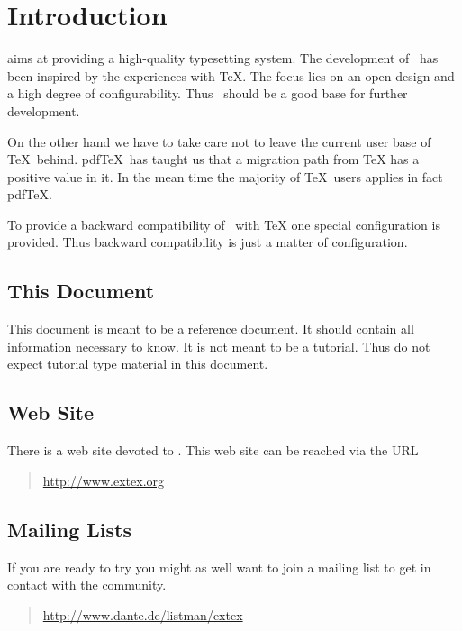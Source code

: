 \documentclass{extex-doc}
\begin{document}
\chapter{Introduction}

\ExTeX{} aims at providing a high-quality typesetting system. The
development of \ExTeX\ has been inspired by the experiences with \TeX.
The focus lies on an open design and a high degree of configurability.
Thus \ExTeX\ should be a good base for further development.

On the other hand we have to take care not to leave the current user
base of \TeX\ behind. pdf\TeX\ has taught us that a migration path
from \TeX{} has a positive value in it. In the mean time
the majority of \TeX\ users applies in fact
pdf\TeX{}.

To provide a backward compatibility of \ExTeX\ with
\TeX{} one special configuration is provided. Thus
backward compatibility is just a matter of configuration.


\section{This Document}

This document is meant to be a reference document. It should contain
all information necessary to know. It is not meant to be a tutorial.
Thus do not expect tutorial type material in this document.


\section{Web Site}

There is a web site devoted to \ExTeX. This
web site can be reached via the URL

\begin{quotation}
  \url{http://www.extex.org}
\end{quotation}


\section{Mailing Lists}

If you are ready to try \ExTeX{} you might as well want to join a
mailing list to get in contact with the community.

\begin{quotation}
  \url{http://www.dante.de/listman/extex}
\end{quotation}
\end{document}
